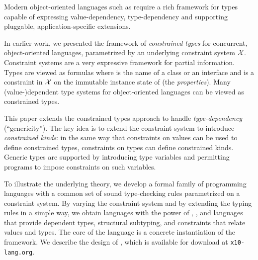 Modern object-oriented languages such as \Xten require a rich framework
for types capable of expressing value-dependency, type-dependency
and supporting pluggable, application-specific extensions.

In earlier work, we presented the framework of \emph{constrained
types} for concurrent, object-oriented languages, parametrized by
an underlying constraint system $\cal X$. Constraint systems are a
very expressive framework for partial information. Types are viewed
as formulas  where  is the name of a class
or an interface and  is a constraint in $\cal X$ on the
immutable instance state of  (the \emph{properties}).
Many (value-)dependent type systems for object-oriented languages
can be viewed as constrained types.

This paper extends the constrained types approach to handle
\emph{type-dependency} (``genericity''). The key idea is to extend
the constraint system to introduce \emph{constrained kinds}: in
the same way that constraints on values can be used to define
constrained types, constraints on types can
define constrained kinds.
Generic types are supported
by introducing type variables and permitting programs to impose
constraints on such variables.

To illustrate the underlying theory, we develop a formal family of
programming languages with a common set of sound type-checking rules
parametrized on a constraint system.  By varying the constraint system
and by extending the typing rules in a simple way, we obtain
languages with the power
of \FJ, \FGJ, and languages that provide dependent types, structural
subtyping, and constraints that relate values and types.  The core
of the \Xten language is a concrete instantiation of the framework.  We
describe the design of \Xten, which is available
for download at \texttt{x10-lang.org}.

